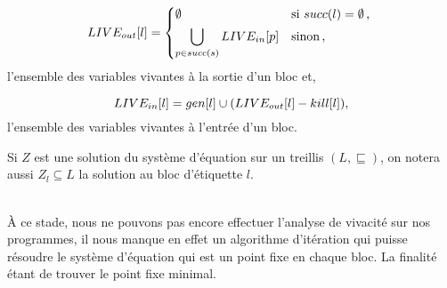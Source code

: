 \documentclass[a4paper, 10pt]{article}
\begin{document}
\[
	\liveout{l} = 
	\begin{dcases*}
		\emptyset &si $succ(l) = \emptyset $\,, \\
		\bigcup\limits_{p\in succ(s)} \livein{p} &sinon\,,
	\end{dcases*}
\]
l'ensemble des variables vivantes à la sortie d'un bloc et,

\[
	LIVE_{in}[l] = gen[l] \cup (LIVE_{out}[l] - kill[l]),
\]
l'ensemble des variables vivantes à l'entrée d'un bloc.
\\
\begin{notation}
	Si $Z$ est une solution du système d'équation sur un treillis $(L, \sqsubseteq)$, on notera aussi $Z_l \subseteq L$
	la solution au bloc d'étiquette $l$.
\end{notation}
\\
À ce stade, nous ne pouvons pas encore effectuer l'analyse de vivacité sur nos programmes, il nous manque en
effet un algorithme d'itération qui puisse résoudre le système d'équation qui est un point fixe en chaque bloc.
La finalité étant de trouver le point fixe minimal.
\end{document}
